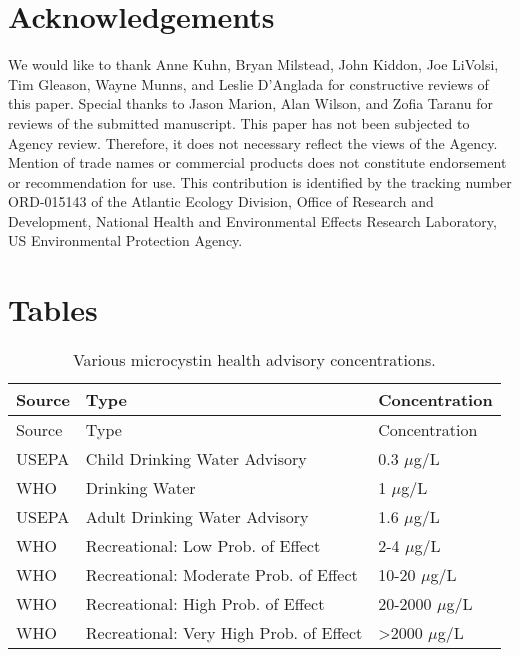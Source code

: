 \documentclass[11pt,]{article}
\begin{document}
\section{Acknowledgements}\label{acknowledgements}

We would like to thank Anne Kuhn, Bryan Milstead, John Kiddon, Joe
LiVolsi, Tim Gleason, Wayne Munns, and Leslie D'Anglada for constructive
reviews of this paper. Special thanks to Jason Marion, Alan Wilson, and
Zofia Taranu for reviews of the submitted manuscript. This paper has not
been subjected to Agency review. Therefore, it does not necessary
reflect the views of the Agency. Mention of trade names or commercial
products does not constitute endorsement or recommendation for use. This
contribution is identified by the tracking number ORD-015143 of the
Atlantic Ecology Division, Office of Research and Development, National
Health and Environmental Effects Research Laboratory, US Environmental
Protection Agency.

\newpage

\section{Tables}\label{tables}

\begin{longtable}[c]{@{}lll@{}}
\caption{Various microcystin health advisory concentrations.
\label{tab:microcystin_levels}}\tabularnewline
\toprule
Source & Type & Concentration\tabularnewline
\midrule
\endfirsthead
\toprule
Source & Type & Concentration\tabularnewline
\midrule
\endhead
USEPA & Child Drinking Water Advisory & 0.3 \(\mu\)g/L\tabularnewline
WHO & Drinking Water & 1 \(\mu\)g/L\tabularnewline
USEPA & Adult Drinking Water Advisory & 1.6 \(\mu\)g/L\tabularnewline
WHO & Recreational: Low Prob. of Effect & 2-4 \(\mu\)g/L\tabularnewline
WHO & Recreational: Moderate Prob. of Effect & 10-20
\(\mu\)g/L\tabularnewline
WHO & Recreational: High Prob. of Effect & 20-2000
\(\mu\)g/L\tabularnewline
WHO & Recreational: Very High Prob. of Effect & \textgreater{}2000
\(\mu\)g/L\tabularnewline
\bottomrule
\end{longtable}

\newpage
\end{document}
